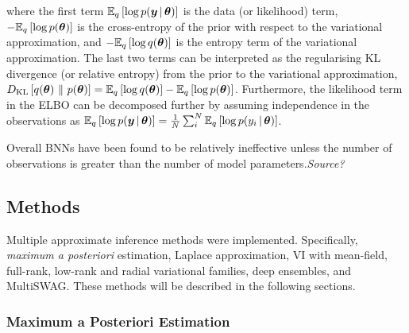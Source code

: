 \documentclass[10pt,a4paper,twocolumn]{article}
\begin{document}
where the first term \(\mathbb{E}_{q}\left[\log p(\bm y \, | \, \bm \theta)\right]\) is the data (or likelihood) term, \(-\mathbb{E}_{q}\left[\log p(\bm \theta)\right]\) is the cross-entropy of the prior with respect to the variational approximation, and \(-\mathbb{E}_{q}\left[\log q(\bm \theta)\right]\) is the entropy term of the variational approximation.
The last two terms can be interpreted as the regularising KL divergence (or relative entropy) from the prior to the variational approximation, \(D_{\mathrm{KL}}\left[q(\bm \theta)\ \lVert\ p(\bm \theta)\right] = \mathbb{E}_{q}\left[\log q(\bm \theta)\right] - \mathbb{E}_{q}\left[\log p(\bm \theta)\right]\).
Furthermore, the likelihood term in the ELBO can be decomposed further by assuming independence in the observations as \(\mathbb{E}_{q}\left[\log p(\bm y \, | \, \bm \theta)\right] = \frac{1}{N} \sum^N_i \mathbb{E}_{q}\left[\log p(y_i \, | \, \bm \theta)\right]\).

Overall BNNs have been found to be relatively ineffective unless the number of observations is greater than the number of model parameters.\emph{Source?}

\subsection{Methods}\label{ssec:methods}

Multiple approximate inference methods were implemented.
Specifically, \emph{maximum a posteriori} estimation, Laplace approximation, VI with mean-field, full-rank, low-rank and radial variational families, deep ensembles, and MultiSWAG.
These methods will be described in the following sections.

\subsubsection{Maximum a Posteriori Estimation}
\end{document}
